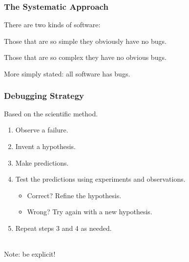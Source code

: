\begin{frame}
\frametitle{The Systematic Approach}
\begin{changemargin}{1cm}
There are two kinds of software:

Those that are so simple they obviously have no bugs.

Those that are so complex they have no obvious bugs.


More simply stated: all software has bugs.

\end{changemargin}
\end{frame}

\begin{frame}
\frametitle{Debugging Strategy}

\begin{changemargin}{1cm}
\Large
Based on the scientific method.
\end{changemargin}

\begin{changemargin}{2.3cm} \setlength{\itemsep}{1.5em}
\large
\begin{enumerate}
\item Observe a failure.
\item Invent a hypothesis.
\item Make predictions.
\item Test the predictions using experiments and observations.
\begin{itemize}
\item Correct? Refine the hypothesis.
\item Wrong? Try again with a new hypothesis.
\end{itemize}
\item Repeat steps 3 and 4 as needed.
\end{enumerate}

~\\
Note: be explicit!
\end{changemargin}

\end{frame}

